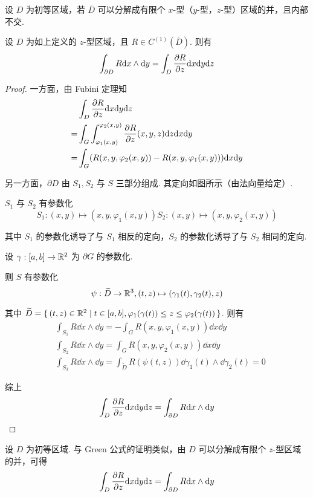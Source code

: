 \begin{definition}
    设 $D$ 为初等区域，若 $\overline{D}$ 可以分解成有限个 $x$-型（$y$-型，$z$-型）区域的并，且内部不交.
\end{definition}

\begin{lemma}
    设 $D$ 为如上定义的 $z$-型区域，且 $R\in C^{(1)}(\overline{D})$. 则有
$$
\int_{\partial D}R\mathrm{d} x\wedge\mathrm{d} y=\int_D\frac{\partial{R}}{\partial{z}}\mathrm{d} x\mathrm{d} y\mathrm{d} z
$$
\end{lemma}
\begin{proof}
    一方面，由 Fubini 定理知
$$
\begin{aligned}
    &\int_D\frac{\partial{R}}{\partial{z}}\mathrm{d} x\mathrm{d} y\mathrm{d} z\\
    =&\int_G\int_{\varphi_1(x,y)}^{\varphi_2(x,y)}\frac{\partial{R}}{\partial{z}}(x,y,z)\mathrm{d} z\mathrm{d} x\mathrm{d} y\\
    =&\int_G(R(x,y,\varphi_2(x,y))-R(x,y,\varphi_1(x,y)))\mathrm{d} x\mathrm{d} y
\end{aligned}
$$

    另一方面，$\partial D$ 由 $S_1,S_2$ 与 $S$ 三部分组成. 其定向如图所示（由法向量给定）.


    $S_1$ 与 $S_2$ 有参数化
$$
S_1:(x,y)\mapsto(x,y,\varphi_1(x,y))
S_2:(x,y)\mapsto(x,y,\varphi_2(x,y))
$$

    其中 $S_1$ 的参数化诱导了与 $S_1$ 相反的定向，$S_2$ 的参数化诱导了与 $S_2$ 相同的定向.

    设 $\gamma:[a,b]\to\mathbb{R}^2$ 为 $\partial G$ 的参数化.

    则 $S$ 有参数化
$$
\psi:\widetilde{D}\to\mathbb{R}^3,(t,z)\mapsto(\gamma_1(t),\gamma_2(t),z)
$$

    其中 $\widetilde{D}=\set{(t,z)\in\mathbb{R}^2|t\in[a,b],\varphi_1(\gamma(t))\le z\le\varphi_2(\gamma(t))}$. 则有
$$
\begin{aligned}
    &\int_{S_1}R\dd x\wedge\dd y=-\int_GR(x,y,\varphi_1(x,y))\dd x\dd y\\
    &\int_{S_2}R\dd x\wedge\dd y=\int_GR(x,y,\varphi_2(x,y))\dd x\dd y\\
    &\int_{S_3}R\dd x\wedge\dd y=\int_{\widetilde{D}}R(\psi(t,z))\dd\gamma_1(t)\wedge\dd\gamma_2(t)=0
\end{aligned}
$$

    综上
$$
\int_D\frac{\partial{R}}{\partial{z}}\mathrm{d} x\mathrm{d} y\mathrm{d} z=\int_{\partial D}R\mathrm{d} x\wedge\mathrm{d} y
$$
\end{proof}

设 $D$ 为初等区域. 与 Green 公式的证明类似，由 $D$ 可以分解成有限个 $z$-型区域的并，可得
$$
\int_D\frac{\partial{R}}{\partial{z}}\mathrm{d} x\mathrm{d} y\mathrm{d} z=\int_{\partial D}R\mathrm{d} x\wedge\mathrm{d} y
$$

